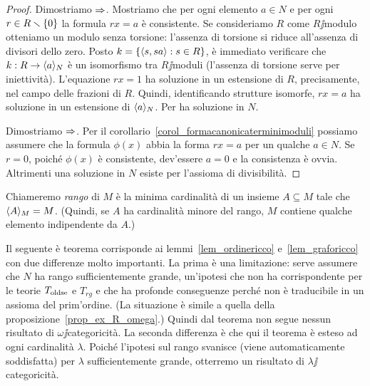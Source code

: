 \begin{proof}
Dimostriamo $\Rightarrow$. Mostriamo che per ogni elemento $a\in N$ e per ogni $r\in R\smallsetminus \{0\}$ la formula $rx=a$ \`e consistente. Se consideriamo $R$ come $R\jj$modulo otteniamo un modulo senza torsione: l'assenza di torsione si riduce all'assenza di divisori dello zero.  Posto $k=\{\langle s,sa\rangle : s\in R\}$, \`e immediato verificare che $k:R\rightarrow\langle a\rangle_N$ \`e un isomorfismo tra $R\jj$moduli (l'assenza di torsione serve per iniettivit\`a). L'equazione $rx=1$ ha soluzione in un estensione di $R$, precisamente, nel campo delle frazioni di $R$. Quindi, identificando strutture isomorfe, $rx=a$ ha soluzione in un estensione di $\langle a\rangle_N$. Per  ha soluzione in $N$.

Dimostriamo $\Rightarrow$. Per il corollario~\ref{corol_formacanonicaterminimoduli} possiamo assumere che la formula $\phi(x)$ abbia la forma $r x= a$ per un qualche $a\in N$. Se $r=0$, poich\'e $\phi(x)$ \`e consistente, dev'essere $a=0$ e la consistenza \`e ovvia. Altrimenti una soluzione in $N$ esiste per l'assioma di divisibilit\`a.
\end{proof}

Chiameremo \emph{rango\/} di $M$ \`e la minima cardinalit\`a di un insieme $A\subseteq M$ tale che $\langle A\rangle_M=M$. (Quindi, se $A$ ha cardinalit\`a minore del rango, $M$ contiene qualche elemento indipendente da $A$.)

Il seguente \`e teorema corrisponde ai lemmi~\ref{lem_ordinericco} e~\ref{lem_graforicco} con due differenze molto importanti. La prima \`e una limitazione: serve assumere che $N$ ha rango sufficientemente grande, un'ipotesi che non ha corrispondente per le teorie $T_{\rm oldse}$ e $T_{rg}$ e che ha profonde conseguenze perch\'e non \`e traducibile in un assioma del prim'ordine. (La situazione \`e simile a quella della proposizione~\ref{prop_ex_R_omega}.) Quindi dal teorema non segue nessun risultato di $\omega\jj$categoricit\`a. La seconda differenza \`e che qui il teorema \`e esteso ad ogni cardinalit\`a $\lambda$. Poich\'e l'ipotesi sul rango svanisce (viene automaticamente soddisfatta) per $\lambda$ sufficientemente grande, otterremo un risultato di $\lambda\jj$categoricit\`a.


